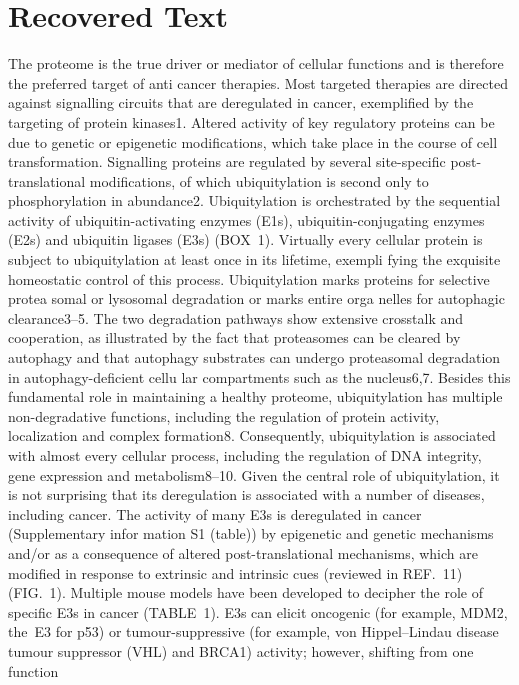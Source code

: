 \section{Recovered Text}
The proteome is the true driver or mediator of cellular
functions and is therefore the preferred target of anti­
cancer therapies. Most targeted therapies are directed
against signalling circuits that are deregulated in cancer,
exemplified by the targeting of protein kinases1. Altered
activity of key regulatory proteins can be due to genetic or
epigenetic modifications, which take place in the course
of cell transformation. Signalling proteins are regulated
by several site-specific post-translational modifications,
of which ubiquitylation is second only to phosphorylation
in abundance2. Ubiquitylation is orchestrated by the
sequential activity of ubiquitin-­activating enzymes (E1s),
ubiquitin-conjugating enzymes (E2s) and ubiquitin ligases
(E3s) (BOX 1). Virtually every cellular protein is subject
to ubiquitylation at least once in its lifetime, exempli­
fying the exquisite homeostatic control of this process.
Ubiquitylation marks proteins for selective protea­
somal or lysosomal degradation or marks entire orga­
nelles for autophagic clearance3–5. The two degradation
pathways show extensive crosstalk and cooperation, as
illustrated by the fact that proteasomes can be cleared
by autophagy and that autophagy substrates can undergo
proteasomal degradation in autophagy-deficient cellu­
lar compartments such as the nucleus6,7. Besides this
fundamental role in maintaining a healthy proteome,
ubiquitylation has multiple non-degradative functions,
including the regulation of protein activity, localization
and complex formation8. Consequently, ubiquitylation is
associated with almost every cellular process, including
the regulation of DNA integrity, gene expression and
metabo­lism8–10. Given the central role of ubiquitylation,
it is not surprising that its deregulation is associated with
a number of diseases, including cancer. The activity of
many E3s is deregulated in cancer (Supplementary infor­
mation S1 (table)) by epigenetic and genetic mechanisms
and/or as a consequence of altered post-translational
mechanisms, which are modified in response to extrinsic
and intrinsic cues (reviewed in REF. 11) (FIG. 1).
Multiple mouse models have been developed to
decipher the role of specific E3s in cancer (TABLE 1).
E3s can elicit oncogenic (for example, MDM2, the E3
for p53) or tumour-suppressive (for example, von
Hippel–Lindau disease tumour suppressor (VHL) and
BRCA1) activity; however, shifting from one function
